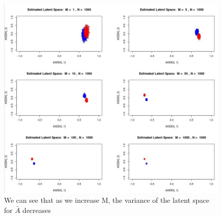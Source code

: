 \documentclass[11pt]{article}
\begin{document}
\begin{figure}[!htb]
	\centering
	\includegraphics[width=18cm]{Capture5.jpg}
	\caption{We can see that as we increase M, the variance of the latent space for $\bar{A}$ decreases}
	\label{fig:plot1}
\end{figure}
\end{document}
